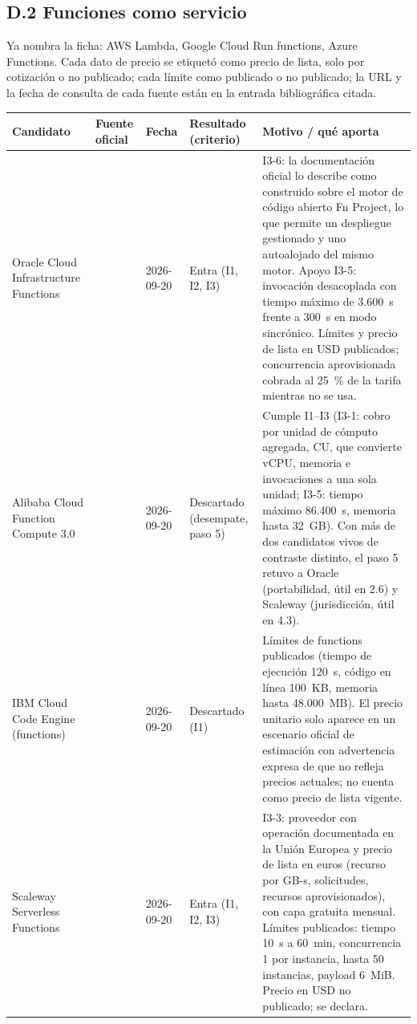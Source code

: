 \documentclass[12pt, letterpaper, table, xcdraw]{inf-pucv}
\begin{document}
\subsection*{D.2 Funciones como servicio}

Ya nombra la ficha: AWS Lambda, Google Cloud Run functions, Azure Functions. Cada dato de precio se etiquetó como precio de lista, solo por cotización o no publicado; cada límite como publicado o no publicado; la URL y la fecha de consulta de cada fuente están en la entrada bibliográfica citada.

{\scriptsize
\begin{longtable}{|p{2.5cm}|p{2.4cm}|p{1.4cm}|p{2.3cm}|p{5.2cm}|}
    \hline
    \textbf{Candidato} & \textbf{Fuente oficial} & \textbf{Fecha} & \textbf{Resultado (criterio)} & \textbf{Motivo / qué aporta} \\
    \hline
    \endhead
    Oracle Cloud Infrastructure Functions & \parencite{oracle2026ocifunctions,oracle2026ocifunctionslimits,oracle2026fnoverview} & 2026-09-20 & Entra (I1, I2, I3) & I3-6: la documentación oficial lo describe como construido sobre el motor de código abierto Fn Project, lo que permite un despliegue gestionado y uno autoalojado del mismo motor. Apoyo I3-5: invocación desacoplada con tiempo máximo de 3.600~s frente a 300~s en modo sincrónico. Límites y precio de lista en USD publicados; concurrencia aprovisionada cobrada al 25~\% de la tarifa mientras no se usa. \\ \hline
    Alibaba Cloud Function Compute 3.0 & \parencite{alibaba2026fcpayg,alibaba2026fclimits,alibaba2026fctrial} & 2026-09-20 & Descartado (desempate, paso 5) & Cumple I1--I3 (I3-1: cobro por unidad de cómputo agregada, CU, que convierte vCPU, memoria e invocaciones a una sola unidad; I3-5: tiempo máximo 86.400~s, memoria hasta 32~GB). Con más de dos candidatos vivos de contraste distinto, el paso 5 retuvo a Oracle (portabilidad, útil en 2.6) y Scaleway (jurisdicción, útil en 4.3). \\ \hline
    IBM Cloud Code Engine (functions) & \parencite{ibm2026codeenginelimits,ibm2026codeenginesample} & 2026-09-20 & Descartado (I1) & Límites de functions publicados (tiempo de ejecución 120~s, código en línea 100~KB, memoria hasta 48.000~MB). El precio unitario solo aparece en un escenario oficial de estimación con advertencia expresa de que no refleja precios actuales; no cuenta como precio de lista vigente. \\ \hline
    Scaleway Serverless Functions & \parencite{scaleway2026serverlesspricing,scaleway2026functionslimits} & 2026-09-20 & Entra (I1, I2, I3) & I3-3: proveedor con operación documentada en la Unión Europea y precio de lista en euros (recurso por GB-s, solicitudes, recursos aprovisionados), con capa gratuita mensual. Límites publicados: tiempo 10~s a 60~min, concurrencia 1 por instancia, hasta 50 instancias, payload 6~MiB. Precio en USD no publicado; se declara. \\ \hline

\end{longtable}}
\end{document}
